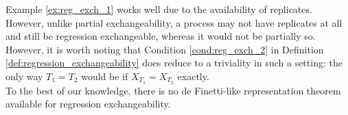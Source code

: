 Example \ref{ex:reg_exch_1} works well due to the availability of replicates. However, unlike partial exchangeability, a process may not have replicates at all and still be regression exchangeable, whereas it would not be partially so. However, it is worth noting that Condition \ref{cond:reg_exch_2} in Definition \ref{def:regression_exchangeability} does reduce to a triviality in such a setting: the only way $T_1 = T_2$ would be if $X_{T_1} = X_{T_2}$ exactly. \\

To the best of our knowledge, there is no de Finetti-like representation theorem available for regression exchangeability.





